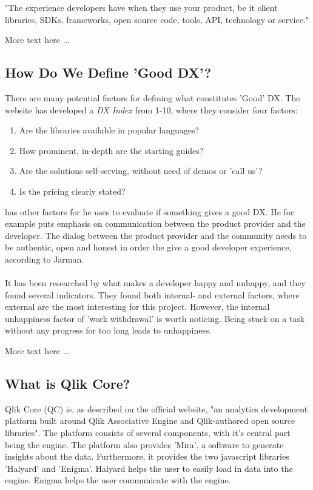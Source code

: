 \documentclass{article}
\begin{document}
\begin{displayquote}
"The experience developers have when they use your product, be it
client libraries, SDKs, frameworks, open source code, tools, API,
technology or service."
\end{displayquote}

More text here ...


\subsection{How Do We Define 'Good DX'?}

There are many potential factors for defining what constitutes 'Good'
DX. The website \cite{everydeveloper} has developed a \textit{DX Index} from
1-10, where they consider four factors:

\begin{enumerate}
\item Are the libraries available in popular languages?
\item How prominent, in-depth are the starting guides?
\item Are the solutions self-serving, without need of demos or 'call us'?
\item Is the pricing clearly stated?
\end{enumerate}
\cite{jarman} has other factors for he uses to evaluate
if something gives a good DX. He for example puts emphasis on
communication between the product provider and the developer. The dialog
between the product provider and the community needs to be authentic,
open and honest in order the give a good developer experience, according
to Jarman.
\\ \\
It has been researched by \cite{unhappy} what makes a developer
happy and unhappy, and they found several indicators. They found both
internal- and external factors, where external are the most interesting
for this project. However, the internal unhappiness factor of 'work
withdrawal' is worth noticing. Being stuck on a task without any
progress for too long leads to unhappiness.

More text here ...

\subsection{What is Qlik Core?}

Qlik Core (QC) is, as described on the official website, "an analytics
development platform built around Qlik Associative Engine and
Qlik-authored open source libraries".\cite{qlikwebsite} The
platform consists of several components, with it's central part being
the engine. The platform also provides 'Mira', a software to generate
insights about the data. Furthermore, it provides the two javascript
libraries 'Halyard' and 'Enigma'. Halyard helps the user to easily load
in data into the engine. Enigma helps the user communicate with the
engine.
\end{document}
